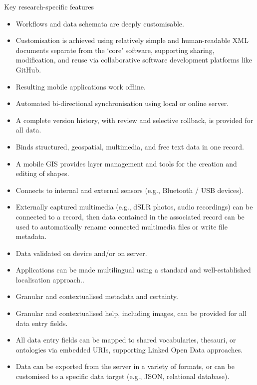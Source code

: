 \documentclass[
	aspectratio=169, %
	12pt, %
	t, %
]{beamer}
\begin{document}
\begin{refsegment}
\begin{frame}[allowframebreaks]{Key research-specific features}
    \begin{itemize}
        \item Workflows and data schemata are deeply customisable.
        \item Customisation is achieved using relatively simple and human-readable XML documents separate from the ‘core’ software, supporting sharing, modification, and reuse via collaborative software development platforms like GitHub.
        \item Resulting mobile applications work offline.
        \item Automated bi-directional synchronisation using local or online server.
        \item A complete version history, with review and selective rollback, is provided for all data.
        \item Binds structured, geospatial, multimedia, and free text data in one record.
        \item A mobile GIS provides layer management and tools for the creation and editing of shapes.
        \item Connects to internal and external sensors (e.g., Bluetooth / USB devices).
        \item Externally captured multimedia (e.g., dSLR photos, audio recordings) can be connected to a record, then data contained in the associated record can be used to automatically rename connected multimedia files or write file metadata.
        \item Data validated on device and/or on server.
        \item Applications can be made multilingual using a standard and well-established localisation approach..
        \item Granular and contextualised metadata and certainty.
        \item Granular and contextualised help, including images, can be provided for all data entry fields.
        \item All data entry fields can be mapped to shared vocabularies, thesauri, or ontologies via embedded URIs, supporting Linked Open Data approaches.
        \item Data can be exported from the server in a variety of formats, or can be customised to a specific data target (e.g., JSON, relational database).
    \end{itemize}
\end{frame}


\end{refsegment}
\end{document}
